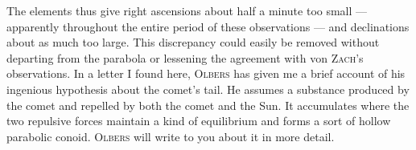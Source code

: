\par\indent The elements thus give right ascensions about half a minute too small --- apparently throughout the entire period of these observations --- and declinations about as much too large. This discrepancy could easily be removed without departing from the parabola or lessening the agreement with von \textsc{Zach}’s observations. In a letter I found here, \textsc{Olbers} has given me a brief account of his ingenious hypothesis about the comet’s tail. He assumes a substance produced by the comet and repelled by both the comet and the Sun. It accumulates where the two repulsive forces maintain a kind of equilibrium and forms a sort of hollow parabolic conoid. \textsc{Olbers} will write to you about it in more detail.
